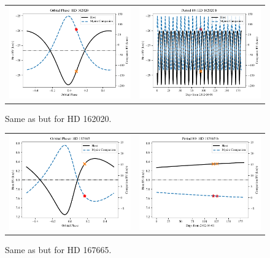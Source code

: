 \begin{figure}
    \centering
    \begin{tabular}{cc}
        \includegraphics[width=0.45\linewidth]{figures/direct-recovery/orbital-plots/HD162020_orbital_phase.pdf}&
        \includegraphics[width=0.45\linewidth]{figures/direct-recovery/orbital-plots/HD162020_p89.pdf}\\
    \end{tabular}
    \caption{Same as  but for HD 162020.}
    \label{fig:hd162020p89}
\end{figure}

\begin{figure}
    \centering
    \begin{tabular}{cc}
        \includegraphics[width=0.45\linewidth]{figures/direct-recovery/orbital-plots/HD167665_orbital_phase.pdf}&
        \includegraphics[width=0.45\linewidth]{figures/direct-recovery/orbital-plots/HD167665_p89.pdf}\\
    \end{tabular}
    \caption{Same as  but for HD 167665.}
    \label{fig:hd167665p89}
\end{figure}

